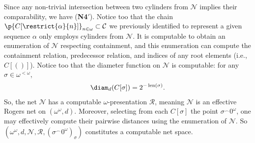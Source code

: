 \begin{example}
    Since any non-trivial intersection between two cylinders from $\mathcal{N}$ implies their comparability, we have (\textbf{N4}$'$). Notice too that the chain $\p{C[\restrict{\alpha}{n}]}_{n \in \omega} \subset \mathcal{C}$ we previously identified to represent a given sequence $\alpha$ only employs cylinders from $\mathcal{N}$. It is computable to obtain an enumeration of $\mathcal{N}$ respecting containment, and this enumeration can compute the containment relation, predecessor relation, and indices of any root elements (i.e., $C[()]$). Notice too that the diameter function on $\mathcal{N}$ is computable: for any $\sigma \in \omega^{<\omega}$, 
    \begin{align*}
        \diam_d(C[\sigma]) = 2^{-\operatorname{len}(\sigma)}.
    \end{align*}
    So, the net $\mathcal{N}$ has a computable $\omega$-presentation $\mathscr{R}$, meaning $\mathcal{N}$ is an effective Rogers net on $(\omega^{\omega}, d)$. Moreover, selecting from each $C[\sigma]$ the point $\sigma ^\smallfrown 0^\omega$, one may effectively compute their pairwise distances using the enumeration of $\mathcal{N}$. So $(\omega^\omega, d, \mathcal{N}, \mathscr{R}, (\sigma^\smallfrown 0^\omega)_\sigma)$ constitutes a computable net space.
\end{example}

